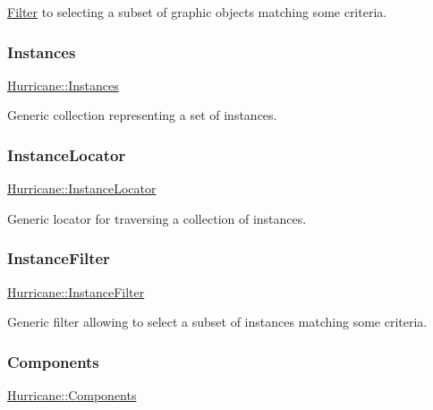 \hyperlink{classHurricane_1_1Filter}{Filter} to selecting a subset of graphic objects matching some criteria. \mbox{\label{namespaceHurricane_ac9436b03a2926f34ad6863deae2baadc}} 
\subsubsection{\texorpdfstring{Instances}{Instances}}
{\footnotesize\ttfamily \hyperlink{namespaceHurricane_ac9436b03a2926f34ad6863deae2baadc}{Hurricane\+::\+Instances}}

Generic collection representing a set of instances. \mbox{\label{namespaceHurricane_af4f7fa4dc3a2d3bdcec6f375dc5a21bc}} 
\subsubsection{\texorpdfstring{Instance\+Locator}{InstanceLocator}}
{\footnotesize\ttfamily \hyperlink{namespaceHurricane_af4f7fa4dc3a2d3bdcec6f375dc5a21bc}{Hurricane\+::\+Instance\+Locator}}

Generic locator for traversing a collection of instances. \mbox{\label{namespaceHurricane_a889ec1441e1876d9addf89dfab32e772}} 
\subsubsection{\texorpdfstring{Instance\+Filter}{InstanceFilter}}
{\footnotesize\ttfamily \hyperlink{namespaceHurricane_a889ec1441e1876d9addf89dfab32e772}{Hurricane\+::\+Instance\+Filter}}

Generic filter allowing to select a subset of instances matching some criteria. \mbox{\label{namespaceHurricane_a7d26d99aeb5dd6d70d51bd35d2473e72}} 
\subsubsection{\texorpdfstring{Components}{Components}}
{\footnotesize\ttfamily \hyperlink{namespaceHurricane_a7d26d99aeb5dd6d70d51bd35d2473e72}{Hurricane\+::\+Components}}

